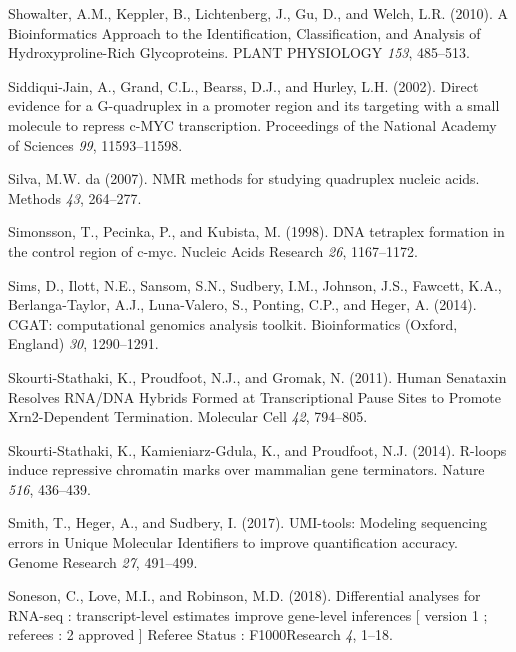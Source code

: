 \documentclass[12pt,a4paper,]{report}
\begin{document}
\leavevmode\hypertarget{ref-Showalter2010}{}%
Showalter, A.M., Keppler, B., Lichtenberg, J., Gu, D., and Welch, L.R.
(2010). A Bioinformatics Approach to the Identification, Classification,
and Analysis of Hydroxyproline-Rich Glycoproteins. PLANT PHYSIOLOGY
\emph{153}, 485--513.

\leavevmode\hypertarget{ref-Siddiqui-Jain2002}{}%
Siddiqui-Jain, A., Grand, C.L., Bearss, D.J., and Hurley, L.H. (2002).
Direct evidence for a G-quadruplex in a promoter region and its
targeting with a small molecule to repress c-MYC transcription.
Proceedings of the National Academy of Sciences \emph{99}, 11593--11598.

\leavevmode\hypertarget{ref-daSilva2007}{}%
Silva, M.W. da (2007). NMR methods for studying quadruplex nucleic
acids. Methods \emph{43}, 264--277.

\leavevmode\hypertarget{ref-Simonsson1998}{}%
Simonsson, T., Pecinka, P., and Kubista, M. (1998). DNA tetraplex
formation in the control region of c-myc. Nucleic Acids Research
\emph{26}, 1167--1172.

\leavevmode\hypertarget{ref-Sims2014}{}%
Sims, D., Ilott, N.E., Sansom, S.N., Sudbery, I.M., Johnson, J.S.,
Fawcett, K.A., Berlanga-Taylor, A.J., Luna-Valero, S., Ponting, C.P.,
and Heger, A. (2014). CGAT: computational genomics analysis toolkit.
Bioinformatics (Oxford, England) \emph{30}, 1290--1291.

\leavevmode\hypertarget{ref-Skourti-Stathaki2011}{}%
Skourti-Stathaki, K., Proudfoot, N.J., and Gromak, N. (2011). Human
Senataxin Resolves RNA/DNA Hybrids Formed at Transcriptional Pause Sites
to Promote Xrn2-Dependent Termination. Molecular Cell \emph{42},
794--805.

\leavevmode\hypertarget{ref-Skourti-Stathaki2014}{}%
Skourti-Stathaki, K., Kamieniarz-Gdula, K., and Proudfoot, N.J. (2014).
R-loops induce repressive chromatin marks over mammalian gene
terminators. Nature \emph{516}, 436--439.

\leavevmode\hypertarget{ref-Smith2017}{}%
Smith, T., Heger, A., and Sudbery, I. (2017). UMI-tools: Modeling
sequencing errors in Unique Molecular Identifiers to improve
quantification accuracy. Genome Research \emph{27}, 491--499.

\leavevmode\hypertarget{ref-Soneson2015}{}%
Soneson, C., Love, M.I., and Robinson, M.D. (2018). Differential
analyses for RNA-seq : transcript-level estimates improve gene-level
inferences {[} version 1 ; referees : 2 approved {]} Referee Status :
F1000Research \emph{4}, 1--18.
\end{document}
